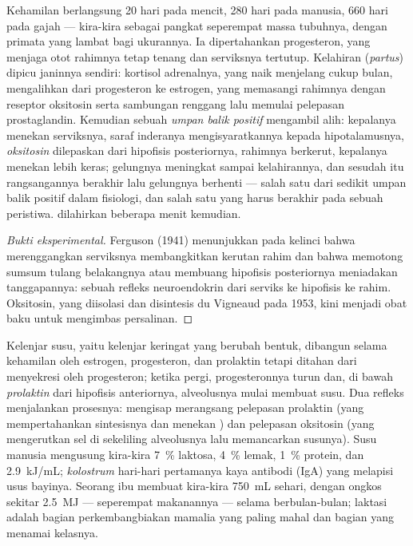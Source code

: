 \begin{proposition}\label{prop:b2:mammal-reproduction:birth}
Kehamilan berlangsung \num{20} hari pada mencit, \num{280} hari pada
manusia, \num{660} hari pada gajah --- kira-kira sebagai pangkat
seperempat massa tubuhnya, dengan primata yang lambat bagi ukurannya.
Ia dipertahankan progesteron, yang menjaga otot rahimnya tetap tenang
dan serviksnya tertutup. Kelahiran (\emph{partus}) dipicu janinnya
sendiri: kortisol
adrenalnya, yang naik menjelang cukup bulan, mengalihkan 
dari progesteron ke estrogen, yang memasangi rahimnya dengan reseptor
oksitosin serta sambungan renggang lalu memulai pelepasan
prostaglandin. Kemudian sebuah \emph{umpan balik positif} mengambil
alih: kepalanya menekan serviksnya, saraf inderanya mengisyaratkannya
kepada hipotalamusnya, \emph{oksitosin} dilepaskan dari hipofisis
posteriornya, rahimnya berkerut, kepalanya menekan lebih keras; gelungnya
meningkat sampai kelahirannya, dan sesudah itu rangsangannya berakhir
lalu gelungnya berhenti --- salah satu dari sedikit umpan balik positif
dalam fisiologi, dan salah satu yang harus berakhir pada sebuah
peristiwa.  dilahirkan beberapa menit kemudian.
\end{proposition}
\begin{proof}[Bukti eksperimental]
Ferguson (1941) menunjukkan pada kelinci bahwa merenggangkan serviksnya
membangkitkan kerutan rahim dan bahwa memotong sumsum tulang
belakangnya atau membuang hipofisis posteriornya meniadakan
tanggapannya: sebuah refleks neuroendokrin dari serviks ke hipofisis ke
rahim. Oksitosin, yang diisolasi dan disintesis du Vigneaud pada 1953,
kini menjadi obat baku untuk mengimbas persalinan.
\end{proof}

\begin{proposition}[Laktasi]\label{prop:b2:mammal-reproduction:lactation}
Kelenjar susu, yaitu kelenjar keringat yang berubah bentuk, dibangun
selama kehamilan oleh estrogen, progesteron, dan prolaktin tetapi
ditahan dari menyekresi oleh progesteron; ketika  pergi,
progesteronnya turun dan, di bawah \emph{prolaktin} dari hipofisis
anteriornya, alveolusnya mulai membuat susu. Dua refleks menjalankan
prosesnya: mengisap merangsang pelepasan prolaktin (yang
mempertahankan sintesisnya dan menekan ) dan pelepasan
oksitosin (yang mengerutkan sel di sekeliling alveolusnya lalu
memancarkan susunya). Susu manusia mengusung kira-kira \qty{7}{\%}
laktosa, \qty{4}{\%} lemak, \qty{1}{\%} protein, dan
\qty{2.9}{kJ/mL}; \emph{kolostrum} hari-hari pertamanya kaya antibodi
(IgA) yang melapisi usus bayinya. Seorang ibu membuat kira-kira
\qty{750}{mL} sehari, dengan ongkos sekitar \qty{2.5}{MJ} --- seperempat
makanannya --- selama berbulan-bulan; laktasi adalah bagian
perkembangbiakan mamalia yang paling mahal dan bagian yang menamai
kelasnya.
\end{proposition}

